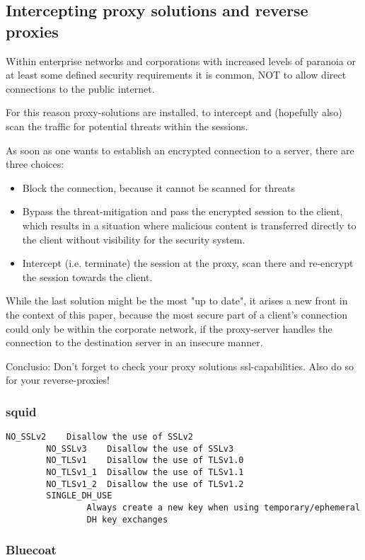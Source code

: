 \subsection{Intercepting proxy solutions and reverse proxies}

Within enterprise networks and corporations with increased levels of paranoia or at least some defined security requirements it is common, NOT to allow direct connections to the public internet.

For this reason proxy-solutions are installed, to intercept and (hopefully also) scan the traffic for potential threats within the sessions.

As soon as one wants to establish an encrypted connection to a server, there are three choices:

\begin{itemize}
\item Block the connection, because it cannot be scanned for threats
\item Bypass the threat-mitigation and pass the encrypted session to the client, which results in a situation where malicious content is transferred directly to the client without visibility for the security system.
\item Intercept (i.e. terminate) the session at the proxy, scan there and re-encrypt the session towards the client.
\end{itemize}

While the last solution might be the most "up to date", it arises a new front in the context of this paper, because the most secure part of a client's connection could only be within the corporate network, if the proxy-server handles the connection to the destination server in an insecure manner.

Conclusio: Don't forget to check your proxy solutions ssl-capabilities. Also do so for your reverse-proxies!

\subsubsection{squid}

\begin{lstlisting}[breaklines]
		NO_SSLv2    Disallow the use of SSLv2
		NO_SSLv3    Disallow the use of SSLv3
		NO_TLSv1    Disallow the use of TLSv1.0
		NO_TLSv1_1  Disallow the use of TLSv1.1
		NO_TLSv1_2  Disallow the use of TLSv1.2
		SINGLE_DH_USE
				Always create a new key when using temporary/ephemeral
				DH key exchanges
\end{lstlisting}

\subsubsection{Bluecoat}

